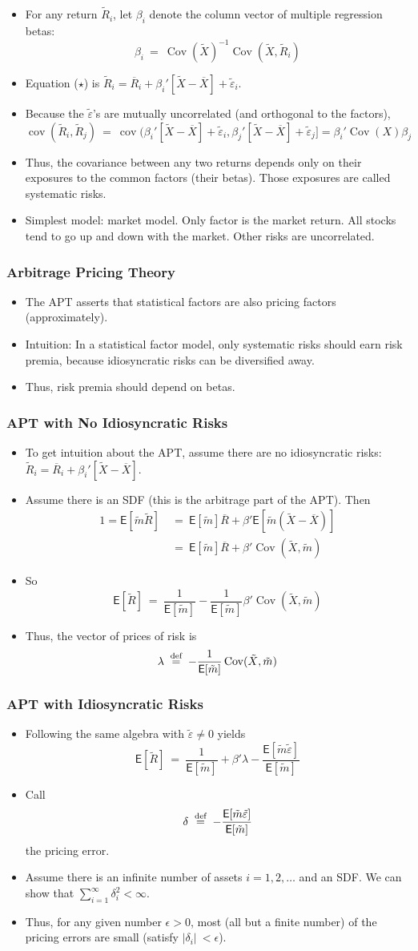 \documentclass[10pt]{beamer}
\DeclareMathOperator{\cov}{cov}
\DeclareMathOperator{\Cov}{Cov}
\newcommand{\bi}{\begin{itemize}}
\newcommand{\ei}{\end{itemize}}
\newcommand{\im}{\item}
\newcommand{\mye}{\ensuremath{\mathsf{E}}}
\newcommand{\eqdef}{\;\buildrel \text{d{}ef}\over = \;}
\newcommand{\bfr}{\begin{frame}}
\newcommand{\tve}{\tilde{\varepsilon}}
\newcommand{\tm}{\tilde{m}}
\newcommand{\tr}{\widetilde{R}}
\newcommand{\tX}{\tilde{X}}
\begin{document}
\bfr\frametitle{}
\bi 
 \im For any return $\tr_i$, let $\beta_i$ denote the column vector of multiple regression betas:
$$\beta_i \ = \ \Cov(\widetilde{X})^{-1}\Cov(\widetilde{X},\tr_i)$$

 \im Equation ($\star$) is $\tr_i = \overline{R}_i + \beta_i'[\tX - \overline{X}] + \tve_i$.

 \im Because the $\tve$'s are mutually uncorrelated (and orthogonal to the factors),
$$\cov(\tr_i,\tr_j) \ = \ \cov(\beta_i'[\tX - \overline{X}] + \tve_i,\beta_j'[\tX - \overline{X}] + \tve_j] = \beta_i'\Cov(X)\beta_j$$

 \im Thus, the covariance between any two returns depends only on their exposures to the common factors (their betas).  Those exposures are called systematic risks.

 \im Simplest model: market model.  Only factor is the market return.  All stocks tend to go up and down with the market.  Other risks are uncorrelated.
\ei 
\end{frame}

\bfr\frametitle{Arbitrage Pricing Theory}
\bi 
 \im The APT asserts that statistical factors are also pricing factors (approximately).

 \im Intuition: In a statistical factor model, only systematic risks should earn risk premia, because idiosyncratic risks can be diversified away.  
 \im Thus, risk premia should depend on betas.
\ei 
\end{frame}

\bfr\frametitle{APT with No Idiosyncratic Risks}
\bi 
 \im To get intuition about the APT, assume there are no idiosyncratic risks: $\tr_i = \overline{R}_i + \beta_i'[\tX - \overline{X}]$.  

 \im Assume there is an SDF (this is the arbitrage part of the APT).  Then
\begin{align*}
 1 = \mye[\tm\tr] \ &= \ \mye[\tm]\overline{R} + \beta'\mye[\tm(\tX - \overline{X})]\\
 &= \ \mye[\tm]\overline{R} + \beta'\Cov(\tX,\tm)
 \end{align*}
 
  \im So
 $$\mye[\tr] \ = \ \frac{1}{\mye[\tm]} - \frac{1}{\mye[\tm]}\beta'\Cov(\tX,\tm)$$
 
  \im Thus, the vector of prices of risk is
 $$\lambda \eqdef - \frac{1}{\mye[\tm]}\Cov(\tX,\tm)$$
\ei 
\end{frame}

\bfr\frametitle{APT with Idiosyncratic Risks}
\bi 
 \im Following the same algebra with $\tve \neq 0$ yields
$$\mye[\tr] \ = \ \frac{1}{\mye[\tm]} +\beta'\lambda - \frac{\mye[\tm\tve]}{\mye[\tm]}$$

 \im Call
$$\delta \eqdef - \frac{\mye[\tm\tve]}{\mye[\tm]}$$
the pricing error.

 \im Assume there is an infinite number of assets $i = 1, 2, \ldots$ and an SDF.  We can show that
$\sum_{i=1}^\infty \delta_i^2 < \infty$.

 \im Thus, for any given number $\epsilon>0$, most (all but a finite number) of the pricing errors are small (satisfy
$|\delta_i|\ < \epsilon$).
\ei 
\end{frame}
\end{document}
